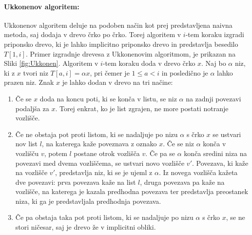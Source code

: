\paragraph{Ukkonenov algoritem:}
Ukkonenov algoritem deluje na podoben način kot prej predstavljena naivna metoda, saj dodaja v drevo črko po črko. Torej algoritem v $i$-tem koraku izgradi priponsko drevo, ki je lahko implicitno priponsko drevo in predstavlja besedilo $T[1,i]$. Primer  izgradnje drevesa z Ukkonenovim algoritmom, je prikazan na Sliki \ref{fig:Ukkonen}. Algoritem v $i$-tem koraku doda v drevo črko $x$. Naj bo $\alpha$ niz, ki z $x$ tvori niz $T[a,i]=\alpha x$, pri čemer je $1\le a <i $ in posledično je $\alpha$ lahko prazen niz. Znak $x$ je lahko dodan v drevo na tri načine:

\begin{enumerate}
    \item Če se $x$ doda na koncu poti, ki se konča v listu, se niz $\alpha$ na zadnji povezavi podaljša za $x$. Torej enkrat, ko je list zgrajen, ne more postati notranje vozlišče. 
    \item Če ne obstaja pot proti listom, ki se nadaljuje po nizu $\alpha$ s črko $x$ se ustvari nov list $l$, na katerega kaže poveznava z oznako $x$. Če se niz $\alpha$ konča v vozlišču $v$, potem $l$ postane otrok vozlišča $v$. Če pa se $\alpha$ konča sredini niza na povezavi med dvema vozliščema, se ustvari novo vozlišče $v'$. Povezava, ki kaže na vozlišče $v'$, predstavlja niz, ki se je ujeml z $\alpha$. Iz novega vozlišča kažeta dve povezavi: prva povezava kaže na list $l$, druga povezava pa kaže na vozlišče, na katerega je kazala predhodna povezava ter predstavlja preostanek niza, ki ga je predstavljala predhodnja povezava.
    \item Če pa obstaja taka pot proti listom, ki se nadaljuje po nizu $\alpha$ s črko $x$, se  ne stori ničesar, saj je drevo že v implicitni obliki.
\end{enumerate}

